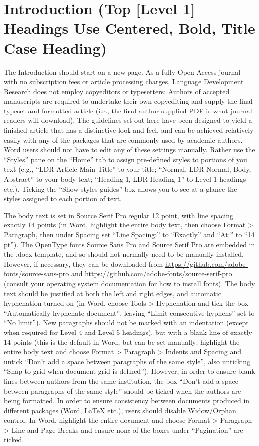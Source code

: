 \documentclass{ldr-article}
\begin{document}
\section{Introduction (Top [Level 1] Headings Use Centered, Bold, Title Case Heading)}

The Introduction should start on a new page. As a fully Open Access journal with no subscription fees or article processing charges, Language Development Research does not employ copyeditors or typesetters: Authors of accepted manuscripts are required to undertake their own copyediting and supply the final typeset and formatted article (i.e., the final author-supplied PDF  is what journal readers will download). The guidelines set out here have been designed to yield a finished article that has a distinctive look and feel, and can be achieved relatively easily with any of the packages that are commonly used by academic authors. Word users should not have to edit any of these settings manually. Rather use the “Styles” pane on the “Home” tab to assign pre-defined styles to portions of you text (e.g., “LDR Article Main Title” to your title; “Normal, LDR Normal, Body, Abstract” to your body text; “Heading 1, LDR Heading 1” to Level 1 headings etc.). Ticking the “Show styles guides” box allows you to see at a glance the styles assigned to each portion of text.

The body text is set in Source Serif Pro regular 12 point, with line spacing exactly 14 points (in Word, highlight the entire body text, then choose Format > Paragraph, then under Spacing set “Line Spacing:” to “Exactly” and “At:” to “14 pt”). The OpenType fonts Source Sans Pro and Source Serif Pro are embedded in the .docx template, and so should not normally need to be manually installed. However, if necessary, they can be downloaded from \url{https://github.com/adobe-fonts/source-sans-pro} and \url{https://github.com/adobe-fonts/source-serif-pro} (consult your operating system documentation for how to install fonts). The body text should be justified at both the left and right edges, and automatic hyphenation turned on (in Word, choose Tools > Hyphenation and tick the box “Automatically hyphenate document”, leaving “Limit consecutive hyphens” set to “No limit”). New paragraphs should not be marked with an indentation (except when required for Level 4 and Level 5 headings), but with a blank line of exactly 14 points (this is the default in Word, but can be set manually: highlight the entire body text and choose Format > Paragraph > Indents and Spacing and untick “Don’t add a space between paragraphs of the same style”, also unticking “Snap to grid when document grid is defined”). However, in order to ensure blank lines between authors from the same institution, the box “Don’t add a space between paragraphs of the same style” should be ticked when the authors are being formatted. In order to ensure consistency between documents produced in different packages (Word, LaTeX etc.), users should disable Widow/Orphan control. In Word, highlight the entire document and choose Format > Paragraph > Line and Page Breaks and ensure none of the boxes under “Pagination” are ticked.
\end{document}
